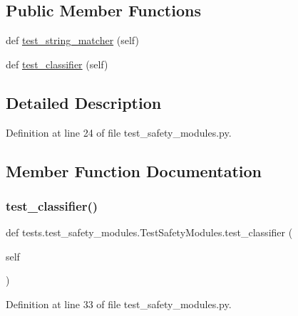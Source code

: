 \subsection*{Public Member Functions}
\begin{DoxyCompactItemize}
\item 
def \hyperlink{classtests_1_1test__safety__modules_1_1TestSafetyModules_aed1e2df090eb0fd87202030400adf2a3}{test\+\_\+string\+\_\+matcher} (self)
\item 
def \hyperlink{classtests_1_1test__safety__modules_1_1TestSafetyModules_ad45ef11e72f311a61895e97b60299b12}{test\+\_\+classifier} (self)
\end{DoxyCompactItemize}


\subsection{Detailed Description}


Definition at line 24 of file test\+\_\+safety\+\_\+modules.\+py.



\subsection{Member Function Documentation}
\mbox{\label{classtests_1_1test__safety__modules_1_1TestSafetyModules_ad45ef11e72f311a61895e97b60299b12}} 
\subsubsection{\texorpdfstring{test\+\_\+classifier()}{test\_classifier()}}
{\footnotesize\ttfamily def tests.\+test\+\_\+safety\+\_\+modules.\+Test\+Safety\+Modules.\+test\+\_\+classifier (\begin{DoxyParamCaption}\item[{}]{self }\end{DoxyParamCaption})}



Definition at line 33 of file test\+\_\+safety\+\_\+modules.\+py.

